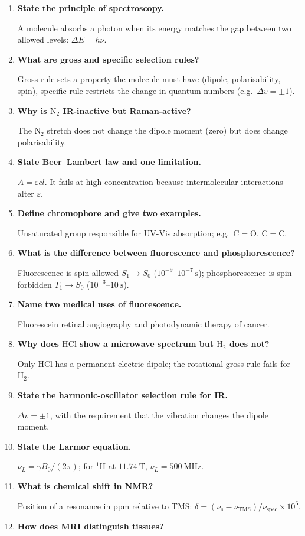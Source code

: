 \documentclass[12pt,a4paper]{article}
\newcommand{\Q}[1]{\textbf{#1}\par\noindent\ignorespaces}
\begin{document}
\begin{tcolorbox}[exambox, title={Frequently Asked / Viva Questions}]
\begin{enumerate}[topsep=0pt, label=\textbf{Q\arabic*.}, itemsep=5pt]
  \item \Q{State the principle of spectroscopy.}
    A molecule absorbs a photon when its energy matches the gap between two allowed levels: $\Delta E = h\nu$.
  \item \Q{What are gross and specific selection rules?}
    Gross rule sets a property the molecule must have (dipole, polarisability, spin), specific rule restricts the change in quantum numbers (e.g.\ $\Delta v=\pm 1$).
  \item \Q{Why is $\mathrm{N_2}$ IR-inactive but Raman-active?}
    The $\mathrm{N_2}$ stretch does not change the dipole moment (zero) but does change polarisability.
  \item \Q{State Beer--Lambert law and one limitation.}
    $A=\varepsilon c l$. It fails at high concentration because intermolecular interactions alter $\varepsilon$.
  \item \Q{Define chromophore and give two examples.}
    Unsaturated group responsible for UV-Vis absorption; e.g.\ $\mathrm{C{=}O}$, $\mathrm{C{=}C}$.
  \item \Q{What is the difference between fluorescence and phosphorescence?}
    Fluorescence is spin-allowed $S_1\to S_0$ ($10^{-9}$--$10^{-7}\ \mathrm{s}$); phosphorescence is spin-forbidden $T_1\to S_0$ ($10^{-3}$--$10\ \mathrm{s}$).
  \item \Q{Name two medical uses of fluorescence.}
    Fluorescein retinal angiography and photodynamic therapy of cancer.
  \item \Q{Why does $\mathrm{HCl}$ show a microwave spectrum but $\mathrm{H_2}$ does not?}
    Only $\mathrm{HCl}$ has a permanent electric dipole; the rotational gross rule fails for $\mathrm{H_2}$.
  \item \Q{State the harmonic-oscillator selection rule for IR.}
    $\Delta v = \pm 1$, with the requirement that the vibration changes the dipole moment.
  \item \Q{State the Larmor equation.}
    $\nu_L=\gamma B_0/(2\pi)$; for $^{1}\mathrm{H}$ at $11.74\ \mathrm{T}$, $\nu_L=500\ \mathrm{MHz}$.
  \item \Q{What is chemical shift in NMR?}
    Position of a resonance in ppm relative to TMS: $\delta=(\nu_s-\nu_{\mathrm{TMS}})/\nu_{\mathrm{spec}}\times 10^{6}$.
  \item \Q{How does MRI distinguish tissues?}

\end{enumerate}
\end{tcolorbox}
\end{document}
